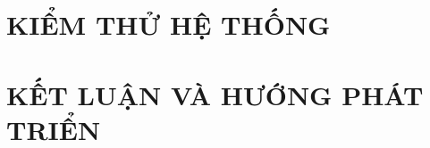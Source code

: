 \documentclass[a4paper,13pt,3p,twoside]{report}
\renewcommand{\bibname}{Danh_sach_tai_lieu_tham_khao}
\theoremstyle{definition}
\begin{document}
\newpage
\chapter{KIỂM THỬ HỆ THỐNG}
\label{chapter:Testing}


\newpage
\chapter{KẾT LUẬN VÀ HƯỚNG PHÁT TRIỂN}
\label{chapter:Conclusion}



\newpage
\renewcommand\bibname{TÀI LIỆU THAM KHẢO}
\printbibliography
{}
\end{document}
